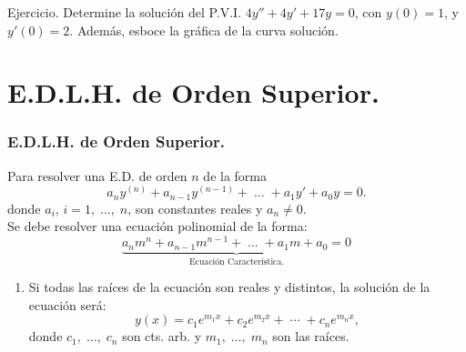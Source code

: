 \documentclass{beamer}
\begin{document}
\begin{frame}[t]
	\begin{alertblock}{Ejercicio.}
		Determine la solución del P.V.I. \(4y'' +4y' +17y=0\), con \(y(0) =1\), y \(y'(0) =2\). Además, esboce la gráfica de la curva solución.
	\end{alertblock}
\end{frame}
\begin{frame}[t]
\end{frame}

\section{E.D.L.H. de Orden Superior.} %
\begin{frame}[t]
	\frametitle{E.D.L.H. de Orden Superior.}
	\begin{block}{}
		Para resolver una E.D. de orden \(n\) de la forma
		\[
			a_ny^{(n)} +a_{n-1} y^{(n-1)} + \;\ldots\; + a_1y' +a_0y =0.
		\]
		donde \(a_i\), \(i=1, \;\ldots,\; n\), son constantes reales y \(a_n \ne 0\). \\[2mm]
		Se debe resolver una ecuación polinomial de la forma:
		\[
			\underbrace{a_nm^n+a_{n-1} m^{n-1} + \;\ldots\; + a_1m+a_0=0} _\text{Ecuación Característica.}
		\]
		\begin{enumerate}
			\item Si todas las raíces de la ecuación son reales y distintos, la solución de la ecuación será:
				\[
					y(x) = c_1e^{m_1x} + c_2e^{m_2x} + \;\cdots\; + c_ne^{m_nx},
				\]
				donde \(c_1, \;\ldots,\; c_n\) son cts. arb. y \(m_1, \;\ldots,\; m_n\) son las raíces.
		\end{enumerate}
	\end{block}
\end{frame}
\end{document}
